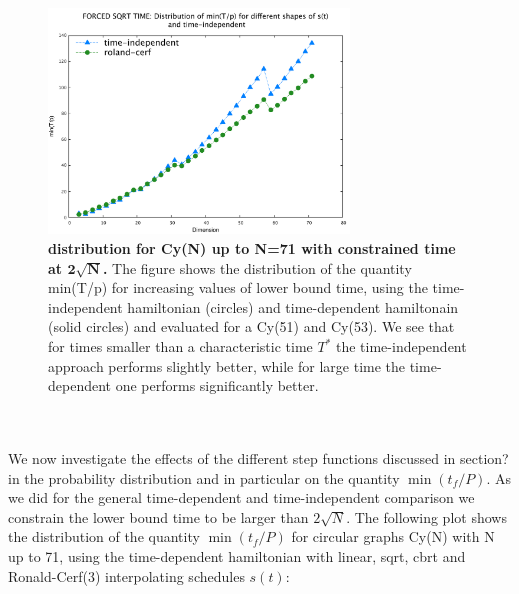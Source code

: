         \begin{figure}[ht]
        \centering
        \includegraphics[width=80mm]{./figures/min_tp_sqrt/forced_delta.pdf}
        \caption[$\min(t_f/P)$ distribution for Cy(N) up to N=71 with constrained time at $\sqrt(N)$.]{\textbf{ distribution for Cy(N) up to N=71 with constrained time at $\bm{2\sqrt{N}}$.} The figure shows the distribution of the quantity min(T/p) for increasing values of lower bound time, using the time-independent hamiltonian (circles) and time-dependent hamiltonain (solid circles) and evaluated for a Cy(51) and Cy(53). We see that for times smaller than a characteristic time $T^*$ the time-independent approach performs slightly better, while for large time the time-dependent one performs significantly better. }
        \label{fig:delta_increasing_time}
        \end{figure} \\ \\ 
        We now investigate the effects of the different step functions discussed in section? in the probability distribution and in particular on the quantity $\min(t_f/P)$. As we did for the general time-dependent and time-independent comparison we constrain the lower bound time to be larger than $2\sqrt{N}$.
        The following plot shows the distribution of the quantity $\min(t_f/P)$ for circular graphs Cy(N) with N up to 71, using the time-dependent hamiltonian with linear, sqrt, cbrt and Ronald-Cerf(3) interpolating schedules $s(t)$:
